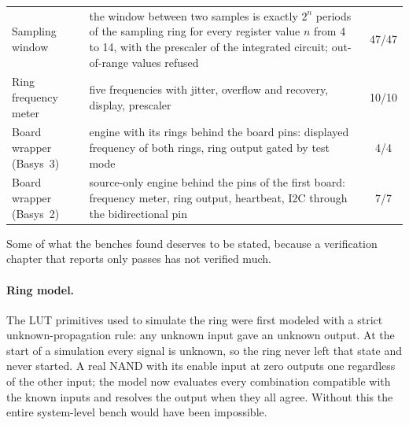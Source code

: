 \begin{table}[htbp]
\begin{tabular}{@{}lp{8.4cm}c@{}}
Sampling window & the window between two samples is exactly $2^{n}$ periods of the sampling ring for every register value $n$ from 4 to 14, with the prescaler of the integrated circuit; out-of-range values refused & 47/47 \\
Ring frequency meter & five frequencies with jitter, overflow and recovery, display, prescaler & 10/10 \\
Board wrapper (Basys~3) & engine with its rings behind the board pins: displayed frequency of both rings, ring output gated by test mode & 4/4 \\
Board wrapper (Basys~2) & source-only engine behind the pins of the first board: frequency meter, ring output, heartbeat, \ac{I2C} through the bidirectional pin & 7/7 \\
\bottomrule
\end{tabular}
\end{table}

Some of what the benches found deserves to be stated, because a
verification chapter that reports only passes has not verified much.

\paragraph{Ring model.} The LUT primitives used to simulate the ring
were first modeled with a strict unknown-propagation rule: any unknown
input gave an unknown output. At the start of a simulation every signal
is unknown, so the ring never left that state and never started. A real
NAND with its enable input at zero outputs one regardless of the other
input; the model now evaluates every combination compatible with the
known inputs and resolves the output when they all agree. Without this
the entire system-level bench would have been impossible.

